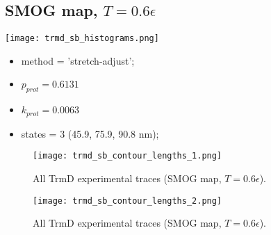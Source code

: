 \subsection{SMOG map, $T=0.6\epsilon$}
\label{subsec:trmd-sb}
\begin{minipage}[c]{0.7\textwidth}
    \texttt{[image: trmd\_sb\_histograms.png]}
\end{minipage}
\hfill
\begin{minipage}[c]{0.45\textwidth}
    \begin{itemize}
        \item method = 'stretch-adjust';
        \item $p_{prot}=0.6131$
        \item $k_{prot}=0.0063$
        \item states = 3 (45.9, 75.9, 90.8 nm);
    \end{itemize}
\end{minipage}

\begin{figure}
    \centering
    \texttt{[image: trmd\_sb\_contour\_lengths\_1.png]}
    \caption{All TrmD experimental traces (SMOG map, $T=0.6\epsilon$).}
    \label{fig:trmd-sb-cl1}
\end{figure}

\begin{figure}
    \centering
    \texttt{[image: trmd\_sb\_contour\_lengths\_2.png]}
    \caption{All TrmD experimental traces (SMOG map, $T=0.6\epsilon$).}
    \label{fig:trmd-sb-cl2}
\end{figure}


